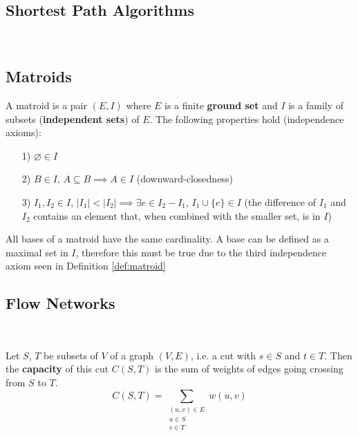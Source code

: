 \subsection{Shortest Path Algorithms}

\
\

\subsection{Matroids}

\begin{definition}[Matroid]\label{def:matroid}
    A matroid is a pair $(E, I)$ where $E$ is a finite \textbf{ground set} and $I$ is a family of subsets (\textbf{independent sets}) of $E$. The following properties hold (independence axioms):
    \begin{itemize}
        \item[1)] $\varnothing \in I$
        \item[2)] $B \in I$, $A \subseteq B \implies A \in I$ (downward-closedness)
        \item[3)] $I_1, I_2 \in I$, $|I_1| < |I_2| \implies \exists e \in I_2 - I_1$, $I_1 \cup \{e\} \in I$ (the difference of $I_1$ and $I_2$ contains an element that, when combined with the smaller set, is in $I$)
    \end{itemize}
\end{definition}

\begin{theorem}
    All bases of a matroid have the same cardinality. A base can be defined as a maximal set in $I$, therefore this must be true due to the third independence axiom seen in Definition \ref{def:matroid}
\end{theorem}

\subsection{Flow Networks}

\
\

\begin{definition}
    Let $S$, $T$ be subsets of $V$ of a graph $(V, E)$, i.e. a cut with $s \in S$ and $t \in T$.
    Then the \textbf{capacity} of this cut $C(S, T)$ is the sum of weights of edges going crossing from $S$ to $T$.
    \[
    C(S, T) = \sum_{\substack{  (u, v) \in E \\ u \in S \\ v \in T}} w(u, v)
    \]
\end{definition}

